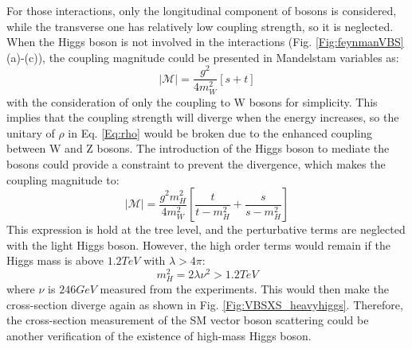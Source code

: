 \noindent
For those interactions, only the longitudinal component of bosons is considered, while the transverse one has relatively low coupling strength, so it is neglected\cite{Brass:2018hfw}. When the Higgs boson is not involved in the interactions (Fig. \ref{Fig:feynmanVBS} (a)-(c)), the coupling magnitude\cite{Barger:1990py} could be presented in Mandelstam variables as:
\begin{equation}
|\mathcal{M}|=\frac{g^2}{4m_{W}^{2}}\left[s+t\right]
\end{equation}
with the consideration of only the coupling to W bosons for simplicity. This implies that the coupling strength will diverge when the energy increases, so the unitary of $\rho$ in Eq. \ref{Eq:rho} would be broken due to the enhanced coupling between W and Z bosons. The introduction of the Higgs boson to mediate the bosons could provide a constraint to prevent the divergence, which makes the coupling magnitude to:
\begin{equation}
|\mathcal{M}|=\frac{g^2m_{H}^2}{4m_{W}^{2}}\left[\frac{t}{t-m_{H}^{2}}+\frac{s}{s-m_{H}^{2}}\right]
\end{equation} 
This expression is hold at the tree level, and the perturbative terms are neglected with the light Higgs boson\cite{Rindani:2009gm}. However, the high order terms would remain if the Higgs mass is above $1.2TeV$ with $\lambda > 4\pi$:
\begin{equation}
m^2_{H}=2\lambda\nu^2 > 1.2TeV
\end{equation}
where $\nu$ is $246GeV$ measured from the experiments. This would then make the cross-section diverge again as shown in Fig. \ref{Fig:VBSXS_heavyhiggs}. Therefore, the cross-section measurement of the SM vector boson scattering could be another verification of the existence of high-mass Higgs boson.  

